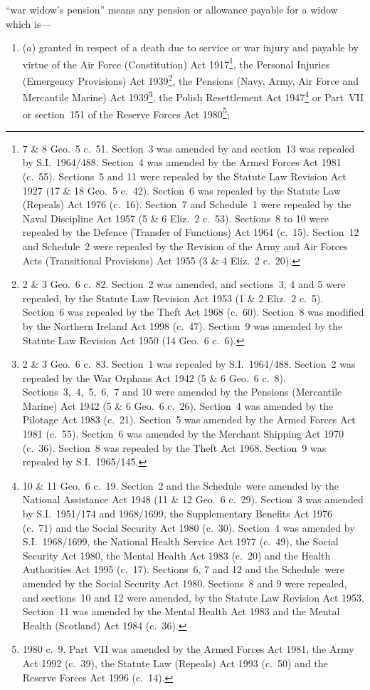 \documentclass[12pt,a4paper]{article}
\begin{document}
\begin{enumerate}
“war widow’s pension” means any pension or allowance payable for a widow which is—
\begin{enumerate}\item[]
($a$) 
granted in respect of a death due to service or war injury and payable by virtue of the Air Force (Constitution) Act 1917\footnote{7 \& 8 Geo.~5 c.\ 51. Section~3 was amended by and section~13 was repealed by S.I.~1964/488. Section~4 was amended by the Armed Forces Act 1981 (c.\ 55). Sections~5 and 11 were repealed by the Statute Law Revision Act 1927 (17 \& 18 Geo.\ 5 c.\ 42). Section~6 was repealed by the Statute Law (Repeals) Act 1976 (c.\ 16). Section~7 and Schedule~1 were repealed by the Naval Discipline Act 1957 (5 \& 6 Eliz.~2 c.\ 53). Sections~8 to 10 were repealed by the Defence (Transfer of Functions) Act 1964 (c.\ 15). Section~12 and Schedule~2 were repealed by the Revision of the Army and Air Forces Acts (Transitional Provisions) Act 1955 (3 \& 4 Eliz.~2 c.\ 20).}, the Personal Injuries (Emergency Provisions) Act 1939\footnote{2 \& 3 Geo.\ 6 c.\ 82. Section~2 was amended, and sections~3, 4 and 5 were repealed, by the Statute Law Revision Act 1953 (1 \& 2 Eliz.~2 c.~5). Section~6 was repealed by the Theft Act 1968 (c.\ 60). Section~8 was modified by the Northern Ireland Act 1998 (c.\ 47). Section~9 was amended by the Statute Law Revision Act 1950 (14 Geo.\ 6 c.\ 6).}, the Pensions (Navy, Army, Air Force and Mercantile Marine) Act 1939\footnote{2 \& 3 Geo.\ 6 c.\ 83. Section~1 was repealed by S.I.~1964/488. Section~2 was repealed by the War Orphans Act 1942 (5 \& 6 Geo.\ 6 c.\ 8). Sections~3,~4,~5,~6,~7 and 10 were amended by the Pensions (Mercantile Marine) Act 1942 (5 \& 6 Geo.\ 6 c.\ 26). Section~4 was amended by the Pilotage Act 1983 (c.\ 21). Section~5 was amended by the Armed Forces Act 1981 (c.\ 55). Section~6 was amended by the Merchant Shipping Act 1970 (c.\ 36). Section~8 was repealed by the Theft Act 1968. Section~9 was repealed by S.I.~1965/145.}, the Polish Resettlement Act 1947\footnote{10 \& 11 Geo.\ 6 c.\ 19. Section~2 and the Schedule~were amended by the National Assistance Act 1948 (11 \& 12 Geo.\ 6 c.\ 29). Section~3 was amended by S.I.~1951/174 and 1968/1699, the Supplementary Benefits Act 1976 (c.\ 71) and the Social Security Act 1980 (c.\ 30). Section~4 was amended by S.I.~1968/1699, the National Health Service Act 1977 (c.\ 49), the Social Security Act 1980, the Mental Health Act 1983 (c.\ 20) and the Health Authorities Act 1995 (c.\ 17). Sections~6, 7 and 12 and the Schedule~were amended by the Social Security Act 1980. Sections~8 and 9 were repealed, and sections~10 and 12 were amended, by the Statute Law Revision Act 1953. Section~11 was amended by the Mental Health Act 1983 and the Mental Health (Scotland) Act 1984 (c.\ 36).} or Part~VII or section~151 of the Reserve Forces Act 1980\footnote{1980 c.\ 9. Part~VII was amended by the Armed Forces Act 1981, the Army Act 1992 (c.\ 39), the Statute Law (Repeals) Act 1993 (c.\ 50) and the Reserve Forces Act 1996 (c.\ 14).};


\end{enumerate}
\end{enumerate}
\end{document}

